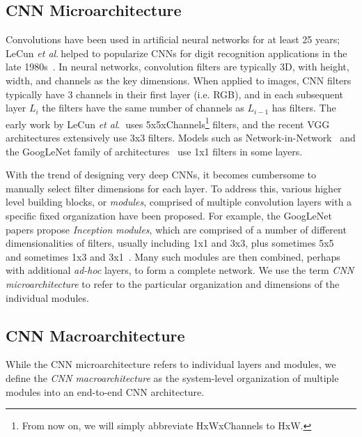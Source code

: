 \documentclass{article} %
\newcommand{\etal}{\textit{et al}.$~$}
\renewcommand{\cite}{\citep}
\def\vsp{\vspace{-0.15in}}
\begin{document}
\subsection{CNN Microarchitecture}
\vsp

Convolutions have been used in artificial neural networks for at least 25 years; LeCun \etal helped to popularize CNNs for digit recognition applications in the late 1980s~\cite{LeCun89}.
In neural networks, convolution filters are typically 3D, with height, width, and channels as the key dimensions.
When applied to images, CNN filters typically have 3 channels in their first layer (i.e. RGB), and in each subsequent layer $L_i$ the filters have the same number of channels as $L_{i-1}$ has filters.
The early work by LeCun \etal\cite{LeCun89} uses 5x5xChannels\footnote{From now on, we will simply abbreviate HxWxChannels to HxW.} filters, and the recent VGG~\cite{VGG-19} architectures extensively use 3x3 filters.
Models such as Network-in-Network~\cite{NiN} and the GoogLeNet family of architectures~\cite{googlenet,googleBN,googlenet-v3,googlenet-v4} use 1x1 filters in some layers.

With the trend of designing very deep CNNs, it becomes cumbersome to manually select filter dimensions for each layer.
To address this, various higher level building blocks, or {\em modules}, comprised of multiple convolution layers with a specific fixed organization have been proposed.
For example, the GoogLeNet papers propose {\em Inception modules}, which are comprised of a number of different dimensionalities of filters, usually including 1x1 and 3x3, plus sometimes 5x5~\cite{googlenet} and sometimes 1x3 and 3x1~\cite{googlenet-v3}.
Many such modules are then combined, perhaps with additional {\em ad-hoc} layers, to form a complete network. 
We use the term {\em CNN microarchitecture} to refer to the particular organization and dimensions of the individual modules. 


\subsection{CNN Macroarchitecture}
\vsp

While the CNN microarchitecture refers to individual layers and modules, we define the {\em CNN macroarchitecture} as the system-level organization of multiple modules into an end-to-end CNN architecture.
\end{document}
